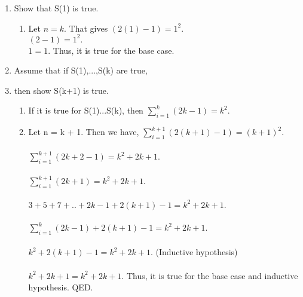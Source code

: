 \documentclass[12pt]{article}
\begin{document}
\begin{enumerate}
\begin{enumerate}
	 \item  Show that S(1) is true.
	 	\begin{enumerate}
	 		\item Let $n = k.$ That gives $(2(1)-1) = 1^2.$\\ $(2-1) = 1^2.$\\ $1 = 1.$ Thus, it is true for the base case.\\	
	 	\end{enumerate}
     \item Assume that if S(1),...,S(k) are true, 
     \item then show S(k+1) is true.
     	\begin{enumerate}
     		\item If it is true for S(1)...S(k), then $\sum_{i = 1}^{k}(2k-1) = k^2.$\\ 
     		\item Let n = k + 1. Then we have, $\sum_{i = 1}^{k+1}(2(k+1)-1) = (k+1)^2.$\\\\ $\sum_{i = 1}^{k+1}(2k+2-1) = k^2 + 2k + 1.$\\\\ $\sum_{i = 1}^{k+1}(2k+1) = k^2 + 2k + 1.$\\\\ $3 + 5 + 7 + .. + 2k-1 + 2(k+1)-1 = k^2 + 2k + 1.$\\\\ $\sum_{i = 1}^{k}(2k-1) + 2(k+1)-1 = k^2 + 2k + 1.$\\\\
     		$k^2 + 2(k+1)-1 = k^2 + 2k + 1.$ (Inductive hypothesis)\\\\ 
     		$k^2 + 2k + 1 = k^2 + 2k + 1.$ Thus, it is true for the base case and inductive hypothesis. QED.
     	\end{enumerate}
     

    
\end{enumerate}


\end{enumerate}
\end{document}
